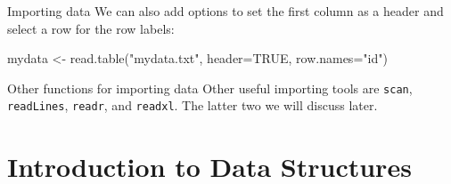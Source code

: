 \documentclass[
  ignorenonframetext,
]{beamer}
\newenvironment{Shaded}{\begin{snugshade}}{\end{snugshade}}
\newcommand{\AttributeTok}[1]{\textcolor[rgb]{0.77,0.63,0.00}{#1}}
\newcommand{\ConstantTok}[1]{\textcolor[rgb]{0.00,0.00,0.00}{#1}}
\newcommand{\FunctionTok}[1]{\textcolor[rgb]{0.00,0.00,0.00}{#1}}
\newcommand{\NormalTok}[1]{#1}
\newcommand{\OtherTok}[1]{\textcolor[rgb]{0.56,0.35,0.01}{#1}}
\newcommand{\StringTok}[1]{\textcolor[rgb]{0.31,0.60,0.02}{#1}}
\begin{document}
\begin{frame}[fragile]{Importing data}
\protect\hypertarget{importing-data-4}{}
We can also add options to set the first column as a header and select a
row for the row labels:

\begin{Shaded}
\begin{Highlighting}[]
\NormalTok{mydata }\OtherTok{\textless{}{-}} \FunctionTok{read.table}\NormalTok{(}\StringTok{"mydata.txt"}\NormalTok{,}
                     \AttributeTok{header=}\ConstantTok{TRUE}\NormalTok{,}
                     \AttributeTok{row.names=}\StringTok{"id"}\NormalTok{)}
\end{Highlighting}
\end{Shaded}
\end{frame}


\begin{frame}[fragile]{Other functions for importing data}
\protect\hypertarget{other-functions-for-importing-data}{}
Other useful importing tools are \texttt{scan}, \texttt{readLines},
\texttt{readr}, and \texttt{readxl}. The latter two we will discuss
later.
\end{frame}

\hypertarget{introduction-to-data-structures}{%
\section{Introduction to Data
Structures}\label{introduction-to-data-structures}}
\end{document}
